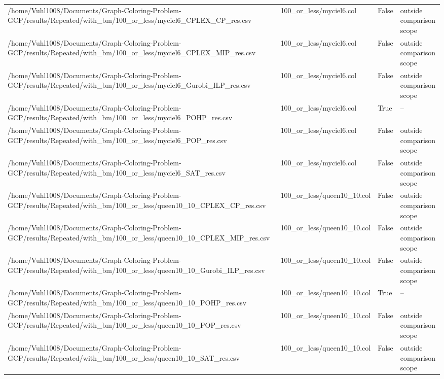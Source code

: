 \begin{table}[htbp]
\begin{tabular}{llll}
/home/Vuhl1008/Documents/Graph-Coloring-Problem-GCP/results/Repeated/with\_bm/100\_or\_less/myciel6\_CPLEX\_CP\_res.csv & 100\_or\_less/myciel6.col & False & outside comparison scope \\
/home/Vuhl1008/Documents/Graph-Coloring-Problem-GCP/results/Repeated/with\_bm/100\_or\_less/myciel6\_CPLEX\_MIP\_res.csv & 100\_or\_less/myciel6.col & False & outside comparison scope \\
/home/Vuhl1008/Documents/Graph-Coloring-Problem-GCP/results/Repeated/with\_bm/100\_or\_less/myciel6\_Gurobi\_ILP\_res.csv & 100\_or\_less/myciel6.col & False & outside comparison scope \\
/home/Vuhl1008/Documents/Graph-Coloring-Problem-GCP/results/Repeated/with\_bm/100\_or\_less/myciel6\_POHP\_res.csv & 100\_or\_less/myciel6.col & True & -- \\
/home/Vuhl1008/Documents/Graph-Coloring-Problem-GCP/results/Repeated/with\_bm/100\_or\_less/myciel6\_POP\_res.csv & 100\_or\_less/myciel6.col & False & outside comparison scope \\
/home/Vuhl1008/Documents/Graph-Coloring-Problem-GCP/results/Repeated/with\_bm/100\_or\_less/myciel6\_SAT\_res.csv & 100\_or\_less/myciel6.col & False & outside comparison scope \\
/home/Vuhl1008/Documents/Graph-Coloring-Problem-GCP/results/Repeated/with\_bm/100\_or\_less/queen10\_10\_CPLEX\_CP\_res.csv & 100\_or\_less/queen10\_10.col & False & outside comparison scope \\
/home/Vuhl1008/Documents/Graph-Coloring-Problem-GCP/results/Repeated/with\_bm/100\_or\_less/queen10\_10\_CPLEX\_MIP\_res.csv & 100\_or\_less/queen10\_10.col & False & outside comparison scope \\
/home/Vuhl1008/Documents/Graph-Coloring-Problem-GCP/results/Repeated/with\_bm/100\_or\_less/queen10\_10\_Gurobi\_ILP\_res.csv & 100\_or\_less/queen10\_10.col & False & outside comparison scope \\
/home/Vuhl1008/Documents/Graph-Coloring-Problem-GCP/results/Repeated/with\_bm/100\_or\_less/queen10\_10\_POHP\_res.csv & 100\_or\_less/queen10\_10.col & True & -- \\
/home/Vuhl1008/Documents/Graph-Coloring-Problem-GCP/results/Repeated/with\_bm/100\_or\_less/queen10\_10\_POP\_res.csv & 100\_or\_less/queen10\_10.col & False & outside comparison scope \\
/home/Vuhl1008/Documents/Graph-Coloring-Problem-GCP/results/Repeated/with\_bm/100\_or\_less/queen10\_10\_SAT\_res.csv & 100\_or\_less/queen10\_10.col & False & outside comparison scope \\

\end{tabular}
\end{table}
